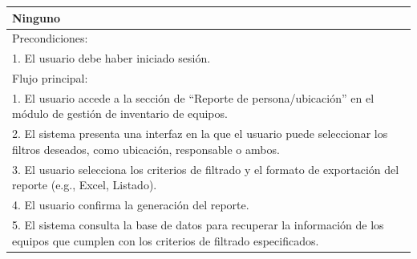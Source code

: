 \documentclass[stu, 12pt, letterpaper, donotrepeattitle, floatsintext, natbib]{apa7}
\begin{document}
\begin{longtable}{@{} p{16.5cm} @{}}
    Ninguno                                                                                                                                                                                                                                                                    \\ \midrule
    Precondiciones:                                                                                                                                                                                                                                                            \\
    1. El usuario debe haber iniciado sesión.                                                                                                                                                                                                                                  \\ \midrule
    Flujo principal:                                                                                                                                                                                                                                                           \\
    1. El usuario accede a la sección de ``Reporte de persona/ubicación'' en el módulo de gestión de inventario de equipos.                                                                                                                                                    \\
    2. El sistema presenta una interfaz en la que el usuario puede seleccionar los filtros deseados, como ubicación, responsable o ambos.                                                                                                                                      \\
    3. El usuario selecciona los criterios de filtrado y el formato de exportación del reporte (e.g., Excel, Listado).                                                                                                                                                         \\
    4. El usuario confirma la generación del reporte.                                                                                                                                                                                                                          \\
    5. El sistema consulta la base de datos para recuperar la información de los equipos que cumplen con los criterios de filtrado especificados.                                                                                                                              \\

\end{longtable}
\end{document}
